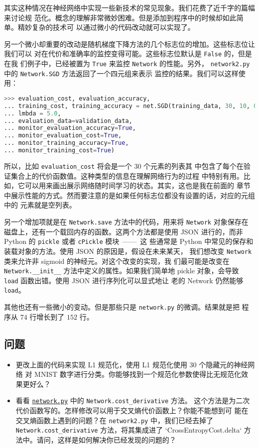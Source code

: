 其实这种情况在神经网络中实现一些新技术的常见现象。我们花费了近千字的篇幅来讨论规
范化。概念的理解非常微妙困难。但是添加到程序中的时候却如此简单。精妙复杂的技术可
以通过微小的代码改动就可以实现了。

另一个微小却重要的改动是随机梯度下降方法的几个标志位的增加。这些标志位让我们可以
对在代价和准确率的监控变得可能。这些标志位默认是 \lstinline!False! 的，但是在我
们例子中，已经被置为 \lstinline!True! 来监控 \lstinline!Network! 的性能。另外，
\lstinline!network2.py! 中的 \lstinline!Network.SGD! 方法返回了一个四元组来表示
监控的结果。我们可以这样使用：
\begin{lstlisting}[language=Python]
>>> evaluation_cost, evaluation_accuracy, 
... training_cost, training_accuracy = net.SGD(training_data, 30, 10, 0.5,
... lmbda = 5.0,
... evaluation_data=validation_data,
... monitor_evaluation_accuracy=True,
... monitor_evaluation_cost=True,
... monitor_training_accuracy=True,
... monitor_training_cost=True)
\end{lstlisting}

所以，比如 \lstinline!evaluation_cost! 将会是一个 $30$ 个元素的列表其
中包含了每个\epoch{}在验证集合上的代价函数值。这种类型的信息在理解网络行为的过程
中特别有用。比如，它可以用来画出展示网络随时间学习的状态。其实，这也是我在前面的
章节中展示性能的方式。然而要注意的是如果任何标志位都没有设置的话，对应的元组中的
元素就是空列表。

另一个增加项就是在 \lstinline!Network.save! 方法中的代码，用来将
\lstinline!Network! 对象保存在磁盘上，还有一个载回内存的函数。这两个方法都是使用
JSON 进行的，而非 Python 的 \lstinline!pickle! 或者 \lstinline!cPickle! 模块~——~这
些通常是 Python 中常见的保存和装载对象的方法。使用 JSON 的原因是，假设在未来某天，
我们想改变 \lstinline!Network! 类来允许非 sigmoid 的神经元。对这个改变的实现，我
们最可能是改变在 \lstinline!Network.__init__! 方法中定义的属性。如果我们简单地
pickle 对象，会导致 \lstinline!load! 函数出错。使用 JSON 进行序列化可以显式地让
老的 Network 仍然能够 \lstinline!load!。

其他也还有一些微小的变动。但是那些只是 \lstinline!network.py! 的微调。结果就是把
程序从 $74$ 行增长到了 $152$ 行。

\subsection*{问题}

\begin{itemize}
\item 更改上面的代码来实现 L1 规范化，使用 L1 规范化使用 $30$ 个隐藏元的神经网络
  对 MNIST 数字进行分类。你能够找到一个规范化参数使得比无规范化效果更好么？
\item 看看 \href{https://github.com/mnielsen/neural-networks-and-deep-learning/blob/master/src/network.py}{\lstinline!network.py!} 中的 \lstinline!Network.cost_derivative! 方法。
  这个方法是为二次代价函数写的。怎样修改可以用于交叉熵代价函数上？你能不能想到可
  能在交叉熵函数上遇到的问题？在 \lstinline!network2.py! 中，我们已经去掉了
  \lstinline!Network.cost_derivative! 方法，将其集成进了
  `CrossEntropyCost.delta` 方法中。请问，这样是如何解决你已经发现的问题的？
\end{itemize}

